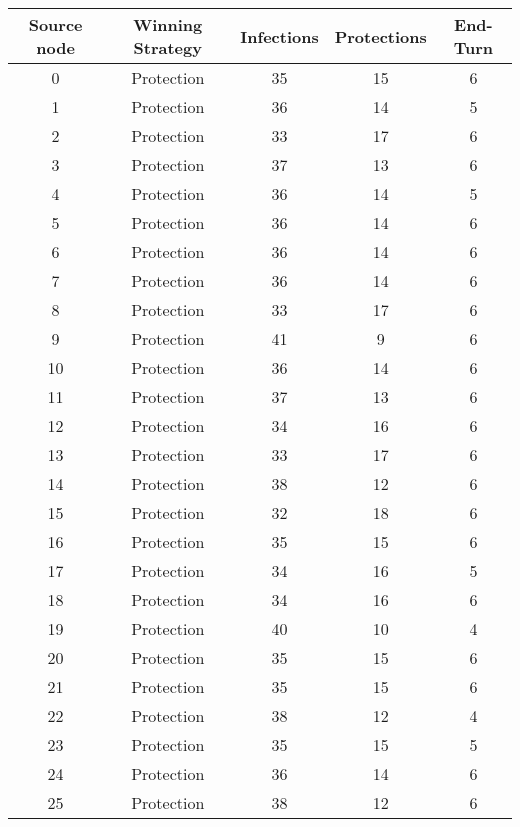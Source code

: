 \documentclass[results.tex]{subfiles}
\begin{document}
\begin{center}
  \begin{tabular}{| c || c | c | c | c |}
    \hline
    {\bfseries Source node} & {\bfseries Winning Strategy} & {\bfseries Infections} & {\bfseries Protections} & {\bfseries End-Turn} \\  %
    \hline\hline
    0 & Protection & 35 & 15 & 6 \\ 
    \hline
    1 & Protection & 36 & 14 & 5 \\ 
    \hline
    2 & Protection & 33 & 17 & 6 \\ 
    \hline
    3 & Protection & 37 & 13 & 6 \\ 
    \hline
    4 & Protection & 36 & 14 & 5 \\ 
    \hline
    5 & Protection & 36 & 14 & 6 \\ 
    \hline
    6 & Protection & 36 & 14 & 6 \\ 
    \hline
    7 & Protection & 36 & 14 & 6 \\ 
    \hline
    8 & Protection & 33 & 17 & 6 \\ 
    \hline
    9 & Protection & 41 & 9 & 6 \\ 
    \hline
    10 & Protection & 36 & 14 & 6 \\ 
    \hline
    11 & Protection & 37 & 13 & 6 \\ 
    \hline
    12 & Protection & 34 & 16 & 6 \\ 
    \hline
    13 & Protection & 33 & 17 & 6 \\ 
    \hline
    14 & Protection & 38 & 12 & 6 \\ 
    \hline
    15 & Protection & 32 & 18 & 6 \\ 
    \hline
    16 & Protection & 35 & 15 & 6 \\ 
    \hline
    17 & Protection & 34 & 16 & 5 \\ 
    \hline
    18 & Protection & 34 & 16 & 6 \\ 
    \hline
    19 & Protection & 40 & 10 & 4 \\ 
    \hline
    20 & Protection & 35 & 15 & 6 \\ 
    \hline
    21 & Protection & 35 & 15 & 6 \\ 
    \hline
    22 & Protection & 38 & 12 & 4 \\ 
    \hline
    23 & Protection & 35 & 15 & 5 \\ 
    \hline
    24 & Protection & 36 & 14 & 6 \\ 
    \hline
    25 & Protection & 38 & 12 & 6 \\ 

\end{tabular}
\end{center}
\end{document}
